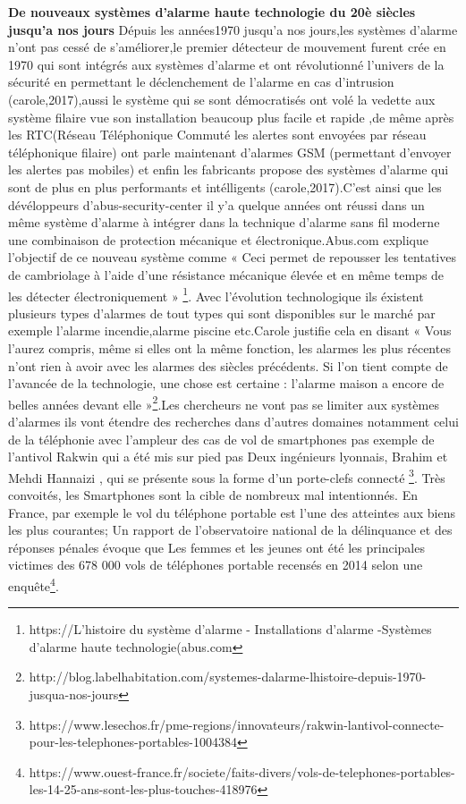 \documentclass[a4paper, 12pt]{article}
\begin{document}
\textbf{De nouveaux systèmes d’alarme haute technologie du 20è siècles jusqu'a nos jours}
Dépuis les années1970 jusqu'a nos jours,les systèmes d'alarme n'ont pas cessé de s'améliorer,le premier détecteur de mouvement furent crée en 1970 qui sont intégrés aux systèmes d'alarme et ont révolutionné l'univers de la sécurité en permettant le déclenchement de l'alarme en cas d'intrusion (carole,2017),aussi le système qui se sont démocratisés ont volé la vedette aux système filaire vue son installation beaucoup plus facile et rapide ,de même après les RTC(Réseau Téléphonique Commuté les alertes sont envoyées par réseau téléphonique filaire) ont parle maintenant d'alarmes GSM (permettant d'envoyer les alertes pas mobiles) et enfin les fabricants propose des systèmes d'alarme qui sont de plus en plus performants et intélligents (carole,2017).C’est ainsi que les dévéloppeurs d'abus-security-center il y'a quelque années ont réussi dans un même système d'alarme à intégrer dans la technique d'alarme sans fil moderne une combinaison de protection mécanique et électronique.Abus.com explique l'objectif de ce nouveau système comme « Ceci permet de repousser les tentatives de cambriolage à l’aide d’une résistance mécanique élevée et en même temps de les détecter électroniquement » \footnote{https://L’histoire du système d’alarme - Installations d'alarme -Systèmes d’alarme haute technologie(abus.com}. 
\quad Avec l'évolution technologique ils éxistent plusieurs types d'alarmes de tout types qui sont disponibles sur le marché par exemple l'alarme incendie,alarme piscine etc.Carole justifie cela en disant « Vous l’aurez compris, même si elles ont la même fonction, les alarmes les plus récentes n’ont rien à avoir avec les alarmes des siècles précédents. Si l’on tient compte de l’avancée de la technologie, une chose est certaine : l’alarme maison a encore de belles années devant elle »\footnote{http://blog.labelhabitation.com/systemes-dalarme-lhistoire-depuis-1970-jusqua-nos-jours }.Les chercheurs ne vont pas se limiter aux systèmes d’alarmes ils vont étendre des recherches dans d’autres domaines notamment celui de la téléphonie avec l’ampleur des cas de vol de smartphones pas exemple de l'antivol Rakwin qui a été mis sur pied pas Deux ingénieurs lyonnais, Brahim et Mehdi Hannaizi , qui se présente sous la forme d'un porte-clefs connecté \footnote{https://www.lesechos.fr/pme-regions/innovateurs/rakwin-lantivol-connecte-pour-les-telephones-portables-1004384}.
Très convoités, les Smartphones sont la cible de nombreux mal intentionnés. En France, par exemple le vol du téléphone portable est l'une des atteintes aux biens les plus courantes; Un rapport de l'observatoire national de la délinquance et des réponses pénales
évoque que Les femmes et les jeunes ont été les principales victimes des 678 000 vols de téléphones portable recensés en 2014 selon une enquête\footnote{https://www.ouest-france.fr/societe/faits-divers/vols-de-telephones-portables-les-14-25-ans-sont-les-plus-touches-418976}.
\end{document}
